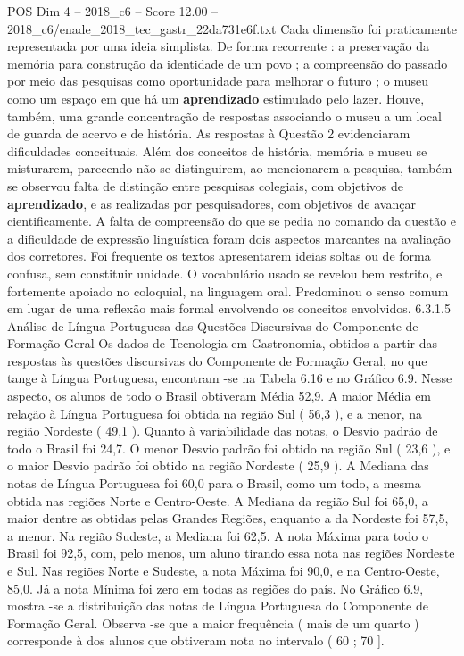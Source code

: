 \begin{textsample}{POS Dim 4 – 2018\_c6 – Score 12.00 – 2018\_c6/enade\_2018\_tec\_gastr\_22da731e6f.txt}
Cada dimensão foi praticamente representada por uma ideia simplista.
De forma recorrente : a preservação da memória para construção da identidade de um povo ; a compreensão do passado por meio das pesquisas como oportunidade para melhorar o futuro ; o museu como um espaço em que há um \textbf{aprendizado} estimulado pelo lazer.
Houve, também, uma grande concentração de respostas associando o museu a um local de guarda de acervo e de história.
As respostas à Questão 2 evidenciaram dificuldades conceituais.
Além dos conceitos de história, memória e museu se misturarem, parecendo não se distinguirem, ao mencionarem a pesquisa, também se observou falta de distinção entre pesquisas colegiais, com objetivos de \textbf{aprendizado}, e as realizadas por pesquisadores, com objetivos de avançar cientificamente.
A falta de compreensão do que se pedia no comando da questão e a dificuldade de expressão linguística foram dois aspectos marcantes na avaliação dos corretores.
Foi frequente os textos apresentarem ideias soltas ou de forma confusa, sem constituir unidade.
O vocabulário usado se revelou bem restrito, e fortemente apoiado no coloquial, na linguagem oral.
Predominou o senso comum em lugar de uma reflexão mais formal envolvendo os conceitos envolvidos. 6.3.1.5 Análise de Língua Portuguesa das Questões Discursivas do Componente de Formação Geral Os dados de Tecnologia em Gastronomia, obtidos a partir das respostas às questões discursivas do Componente de Formação Geral, no que tange à Língua Portuguesa, encontram -se na Tabela 6.16 e no Gráfico 6.9.
Nesse aspecto, os alunos de todo o Brasil obtiveram Média 52,9.
A maior Média em relação à Língua Portuguesa foi obtida na região Sul ( 56,3 ), e a menor, na região Nordeste ( 49,1 ).
Quanto à variabilidade das notas, o Desvio padrão de todo o Brasil foi 24,7.
O menor Desvio padrão foi obtido na região Sul ( 23,6 ), e o maior Desvio padrão foi obtido na região Nordeste ( 25,9 ).
A Mediana das notas de Língua Portuguesa foi 60,0 para o Brasil, como um todo, a mesma obtida nas regiões Norte e Centro-Oeste.
A Mediana da região Sul foi 65,0, a maior dentre as obtidas pelas Grandes Regiões, enquanto a da Nordeste foi 57,5, a menor.
Na região Sudeste, a Mediana foi 62,5.
A nota Máxima para todo o Brasil foi 92,5, com, pelo menos, um aluno tirando essa nota nas regiões Nordeste e Sul.
Nas regiões Norte e Sudeste, a nota Máxima foi 90,0, e na Centro-Oeste, 85,0.
Já a nota Mínima foi zero em todas as regiões do país.
No Gráfico 6.9, mostra -se a distribuição das notas de Língua Portuguesa do Componente de Formação Geral.
Observa -se que a maior frequência ( mais de um quarto ) corresponde à dos alunos que obtiveram nota no intervalo ( 60 ; 70 ].

\end{textsample}
